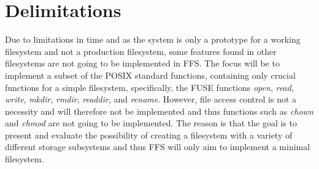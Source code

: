 \section{Delimitations} %

Due to limitations in time and as the system is only a prototype for a working filesystem and not a production filesystem, some features found in other filesystems are not going to be implemented in FFS. The focus will be to implement a subset of the POSIX standard functions, containing only crucial functions for a simple filesystem, specifically, the FUSE functions \textit{open}, \textit{read}, \textit{write}, \textit{mkdir}, \textit{rmdir}, \textit{readdir}, and \textit{rename}. However, file access control is not a necessity and will therefore not be implemented and thus functions such as \textit{chown} and \textit{chmod} are not going to be implemented. The reason is that the goal is to present and evaluate the possibility of creating a filesystem with a variety of different storage subsystems and thus FFS will only aim to implement a minimal filesystem. 